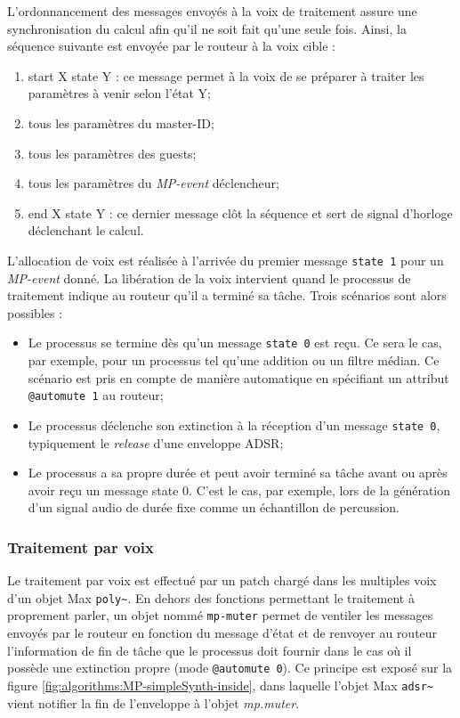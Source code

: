 \noindent L'ordonnancement des messages envoyés à la voix de traitement assure une synchronisation du calcul afin qu'il ne soit fait qu'une seule fois. Ainsi, la séquence suivante est envoyée par le routeur à la voix cible :
\vspace{-1em}
\begin{enumerate}[noitemsep]
	\item start X state Y : ce message permet à la voix de se préparer à traiter les paramètres à venir selon l'état Y;
	\item tous les paramètres du master-ID;
	\item tous les paramètres des guests;
	\item tous les paramètres du \textit{MP-event} déclencheur;
	\item end X state Y : ce dernier message clôt la séquence et sert de signal d'horloge déclenchant le calcul.
\end{enumerate}

\noindent L'allocation de voix est réalisée à l'arrivée du premier message \verb|state 1| pour un \textit{MP-event} donné. La libération de la voix intervient quand le processus de traitement indique au routeur qu'il a terminé sa tâche. Trois scénarios sont alors possibles :
\vspace{-1em}
\begin{itemize}[noitemsep]
	\item Le processus se termine dès qu'un message \verb|state 0| est reçu. Ce sera le cas, par exemple, pour un processus tel qu'une addition ou un filtre médian. Ce scénario est pris en compte de manière automatique en spécifiant un attribut \verb|@automute 1| au routeur;
	\item Le processus déclenche son extinction à la réception d'un message \verb|state 0|, typiquement le \textit{release} d'une enveloppe \gls{ADSR};
	\item Le processus a sa propre durée et peut avoir terminé sa tâche avant ou après avoir reçu un message state 0. C'est le cas, par exemple, lors de la génération d'un signal audio de durée fixe comme un échantillon de percussion.
\end{itemize}

\subsubsection{Traitement par voix}

\noindent Le traitement par voix est effectué par un patch chargé dans les multiples voix d'un objet Max \verb|poly~|. En dehors des fonctions permettant le traitement à proprement parler, un objet nommé \verb|mp-muter| permet de ventiler les messages envoyés par le routeur en fonction du message d'état et de renvoyer au routeur l'information de fin de tâche que le processus doit fournir dans le cas où il possède une extinction propre (mode \verb|@automute 0|). Ce principe est exposé sur la figure \ref{fig:algorithms:MP-simpleSynth-inside}, dans laquelle l'objet Max \verb|adsr~| vient notifier la fin de l'enveloppe à l'objet \textit{mp.muter}.


